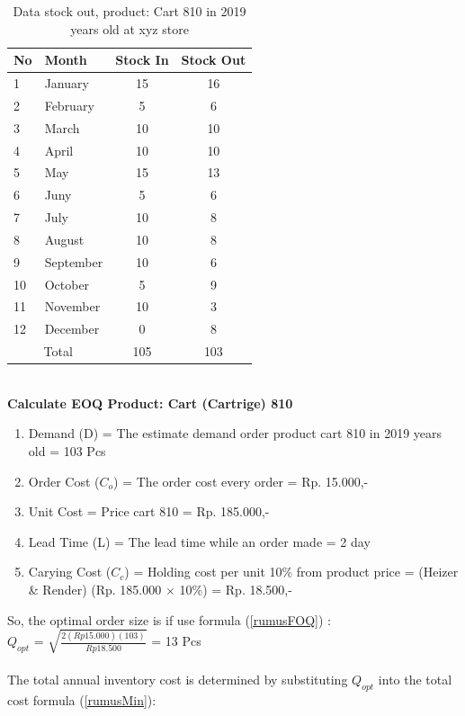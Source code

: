 \documentclass[12pt,a4paper,final]{iopart}
\begin{document}
\begin{table}[h!]
	\centering
	\caption{\label{tableOut} Data stock out, product: Cart 810 in 2019 years old at xyz store}
	\begin{tabular}{ llcc }
		\hline
		\textbf{No} & \textbf{Month} & \textbf{Stock In} & \textbf{Stock Out} \\
		\hline
		1 & January & 15 & 16  \\ 
		2 & February & 5 & 6  \\ 
		3 & March & 10 & 10 \\ 
		4 & April & 10 & 10 \\ 
		5 & May & 15 & 13 \\ 
		6 & Juny & 5 & 6 \\ 
		7 & July & 10 & 8 \\ 
		8 & August & 10 & 8 \\ 
		9 & September & 10 & 6 \\ 
		10 & October & 5 & 9 \\ 
		11 & November & 10 & 3 \\ 
		12 & December & 0 & 8 \\ 
		\hline
		\multicolumn{2}{c}{Total} & {105} & {103}\\
		\hline
	\end{tabular}
\end{table}\\
\textbf{Calculate EOQ Product: Cart (Cartrige) 810}
\begin{enumerate}[label=(\alph*)]
	\item Demand (D) = The estimate demand order product cart 810 in 2019 years old = 103 Pcs
	\item Order Cost ($C_o$) = The order cost every order = Rp. 15.000,-
	\item Unit Cost = Price cart 810 = Rp. 185.000,-
	\item Lead Time (L) = The lead time while an order made = 2 day
	\item Carying Cost ($C_c$) = Holding cost per unit 10\% from product price = (Heizer \& Render) (Rp. 185.000 $\times$ 10\%) = Rp. 18.500,-
\end{enumerate}
So, the optimal order size is if use formula (\ref{rumusFOQ}) :\\

$Q_{opt}$ = $\sqrt{\frac{2(Rp15.000)(103)}{Rp18.500}}$ = 13 Pcs\\ \\
The total annual inventory cost is determined by substituting $Q_{opt}$ into the total cost formula (\ref{rumusMin}):\\
\end{document}
